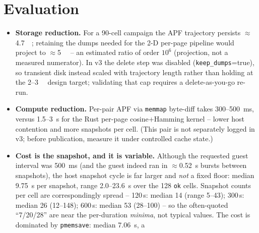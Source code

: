 \documentclass[conference]{IEEEtran}
\begin{document}
\section{Evaluation}
\label{sec:results}
\begin{itemize}
  \item \textbf{Storage reduction.} For a 90-cell campaign the APF trajectory
        persists $\approx$\SI{4.7}{\mebi\byte}; retaining the dumps needed for
        the 2-D per-page pipeline would project to $\approx$\SI{5}{\tebi\byte}
        -- an estimated ratio of order $10^{6}$ (projection, not a measured
        numerator). In v3 the delete step was disabled
        (\texttt{keep\_dumps}=true), so transient disk instead scaled with
        trajectory length rather than holding at the
        \SI{2}{}--\SI{3}{\gibi\byte} design target; validating that cap requires
        a delete-as-you-go re-run.
  \item \textbf{Compute reduction.} Per-pair APF via \texttt{memmap} byte-diff
        takes \SI{300}{}--\SI{500}{\milli\second}, versus \SI{1.5}{}--\SI{3}{\second}
        for the Rust per-page cosine+Hamming kernel -- lower host contention and
        more snapshots per cell. (This pair is not separately logged in v3;
        before publication, measure it under controlled cache state.)
  \item \textbf{Cost is the snapshot, and it is variable.} Although the
        requested guest interval was \SI{500}{\milli\second} (and the guest
        indeed ran in $\approx$\SI{0.52}{\second} bursts between snapshots), the
        host snapshot cycle is far larger and \emph{not} a fixed floor: median
        \SI{9.75}{\second} per snapshot, range \SI{2.0}{}--\SI{23.6}{\second}
        over the 128 \texttt{ok} cells. Snapshot counts per cell are
        correspondingly spread -- 120\,s: median 14 (range 5--43); 300\,s:
        median 26 (12--148); 600\,s: median 53 (28--100) -- so the often-quoted
        ``7/20/28'' are near the per-duration \emph{minima}, not typical values.
        The cost is dominated by \texttt{pmemsave}: median \SI{7.06}{\second}, a

\end{itemize}
\end{document}
